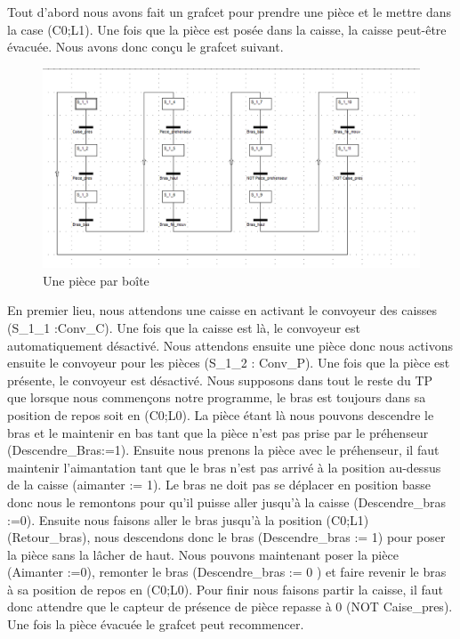 \documentclass[oneside,a4paper,12pt]{article}
\begin{document}
	Tout d’abord nous avons fait un grafcet pour prendre une pièce et le mettre dans la case (C0;L1). Une fois que la pièce est posée dans la caisse, la caisse peut-être évacuée. Nous avons donc conçu le grafcet suivant.\\
	
		\begin{figure}[h]
			\centering
			\includegraphics[width=15cm]{grafcet1.PNG}
			\caption{Une pièce par boîte}
		\end{figure}
	
	En premier lieu, nous attendons une caisse en activant le convoyeur des caisses (S\_1\_1 :Conv\_C). Une fois que la caisse est là, le convoyeur est automatiquement désactivé. Nous attendons ensuite une pièce donc nous activons ensuite le convoyeur pour les pièces (S\_1\_2 : Conv\_P). Une fois que la pièce est présente, le convoyeur est désactivé. Nous supposons dans tout le reste du TP que lorsque nous commençons notre programme, le bras est toujours dans sa position de repos soit en (C0;L0). La pièce étant là nous pouvons descendre le bras et le maintenir en bas tant que la pièce n’est pas prise par le préhenseur (Descendre\_Bras:=1). Ensuite nous prenons la pièce avec le préhenseur, il faut maintenir l’aimantation tant que le bras n’est pas arrivé à la position au-dessus de la caisse (aimanter := 1). Le bras ne doit pas se déplacer en position basse donc nous le remontons pour qu’il puisse aller jusqu'à la caisse (Descendre\_bras :=0). Ensuite nous faisons aller le bras jusqu’à la position (C0;L1) (Retour\_bras), nous descendons donc le bras (Descendre\_bras := 1) pour poser la pièce sans la lâcher de haut. Nous pouvons maintenant poser la pièce (Aimanter :=0), remonter le bras (Descendre\_bras := 0 ) et faire revenir le bras à sa position de repos en (C0;L0). Pour finir nous faisons partir la caisse, il faut donc attendre que le capteur de présence de pièce repasse à 0 (NOT Caise\_pres). Une fois la pièce évacuée le grafcet peut recommencer.
	
\end{document}

